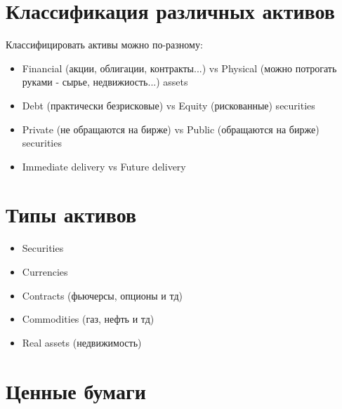 \documentclass{article}
\begin{document}
\section{Классификация различных активов}
Классифицировать активы можно по-разному:
\begin{itemize}
	\item Financial (акции, облигации, контракты...) vs Physical (можно потрогать руками  - сырье, недвижиость...) assets 
	\item Debt (практически безрисковые) vs Equity (рискованные) securities
	\item Private (не обращаются на бирже) vs Public (обращаются на бирже) securities
	\item Immediate delivery vs Future delivery
\end{itemize}
\section{Типы активов}
\begin{itemize}
	\item Securities 
	\item Currencies  
	\item Contracts (фьючерсы, опционы и тд)
	\item Commodities (газ, нефть и тд)
	\item Real assets (недвижимость)
\end{itemize}
\section{Ценные бумаги}
\end{document}
